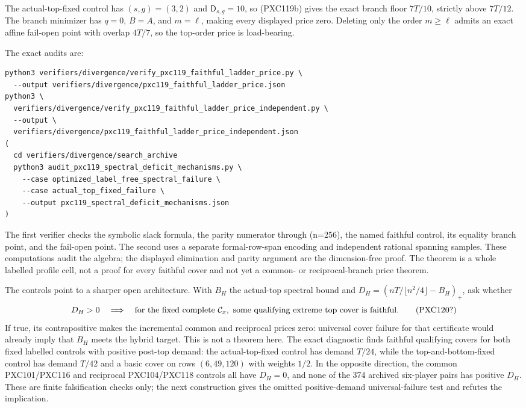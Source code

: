 \documentclass[11pt]{article}
\begin{document}
The actual-top-fixed control has \((s,g)=(3,2)\) and
\(\mathsf D_{s,g}=10\), so (PXC119b) gives the exact branch floor \(7T/10\),
strictly above \(7T/12\).  The branch minimizer has \(q=0\), \(B=A\), and
\(m=\ell\), making every displayed price zero.  Deleting only the order
\(m\ge\ell\) admits an exact affine fail-open point with overlap \(4T/7\),
so the top-order price is load-bearing.

The exact audits are:
\begin{verbatim}
python3 verifiers/divergence/verify_pxc119_faithful_ladder_price.py \
  --output verifiers/divergence/pxc119_faithful_ladder_price.json
python3 \
  verifiers/divergence/verify_pxc119_faithful_ladder_price_independent.py \
  --output \
  verifiers/divergence/pxc119_faithful_ladder_price_independent.json
(
  cd verifiers/divergence/search_archive
  python3 audit_pxc119_spectral_deficit_mechanisms.py \
    --case optimized_label_free_spectral_failure \
    --case actual_top_fixed_failure \
    --output pxc119_spectral_deficit_mechanisms.json
)
\end{verbatim}
The first verifier checks the symbolic slack formula, the parity numerator
through (n=256), the named faithful control, its equality branch point,
and the fail-open point.  The second uses a separate formal-row-span
encoding and independent rational spanning samples.  These computations
audit the algebra; the displayed elimination and parity argument are the
dimension-free proof.  The theorem is a whole labelled profile cell, not a
proof for every faithful cover and not yet a common- or reciprocal-branch
price theorem.

The controls point to a sharper open architecture.  With \(B_H\) the
actual-top spectral bound and
\(D_H=(nT/\lfloor n^2/4\rfloor-B_H)_+\), ask whether
\[
 D_H>0\quad\Longrightarrow\quad
 \text{for the fixed complete }{\cal C}_x,
 \text{ some qualifying extreme top cover is faithful}.       \tag{PXC120?}
\]
If true, its contrapositive makes the incremental common and reciprocal
prices zero: universal cover failure for that certificate would already
imply that \(B_H\) meets
the hybrid target.  This is not a theorem here.  The exact diagnostic finds
faithful qualifying covers for both fixed labelled controls with positive
post-top demand: the actual-top-fixed control has demand \(T/24\), while the
top-and-bottom-fixed control has demand \(T/42\) and a basic cover on rows
\((6,49,120)\) with weights \(1/2\).  In the opposite direction, the common
PXC101/PXC116 and reciprocal PXC104/PXC118 controls all have \(D_H=0\), and
none of the 374 archived six-player pairs has positive \(D_H\).  These are
finite falsification checks only; the next construction gives the omitted
positive-demand universal-failure test and refutes the implication.
\end{document}

